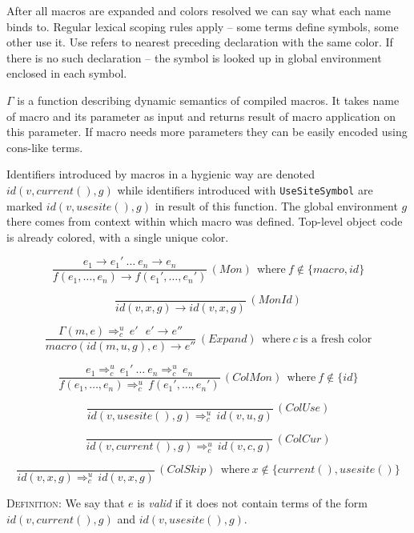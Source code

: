 \documentclass{llncs}
\newcommand{\infrule}[3]{
  \displaystyle
  \frac{#1}{#2}
  \, #3
}
\newcommand{\nf}[2]{#1 \rightarrow #2}
\newcommand{\colr}[2]{#1 \Rightarrow^{u}_{c} \, #2}
\begin{document}
After all macros are expanded and colors resolved we can say what each
name binds to. Regular lexical scoping rules apply -- some terms define
symbols, some other use it. Use refers to nearest preceding declaration
with the same color. If there is no such declaration -- the symbol is
looked up in global environment enclosed in each symbol.

$\Gamma$ is a function describing dynamic semantics of compiled macros.
It takes name of macro and its parameter as input and returns result of
macro application on this parameter. If macro needs more parameters they
can be easily encoded using cons-like terms.

Identifiers introduced by macros in a hygienic way are denoted
$id(v,current(),g)$ while identifiers introduced with \verb,UseSiteSymbol,
are marked $id(v,usesite(),g)$ in result of this function. The
global environment $g$ there comes from context within which macro
was defined. Top-level object code is already colored, with a single
unique color.


$$
  \infrule{
    \nf{e_1}{e_1'} \ \ldots\ \nf{e_n}{e_n}
  }{
    \nf{
      f(e_1, \ldots, e_n)
    }{
      f(e_1', \ldots, e_n')
    }
  }{(Mon) \ \ \textrm{where}\ f \notin \{ macro, id \}}
$$

$$
  \infrule{
  }{
    \nf{
      id (v, x, g)
    }{
      id (v, x, g)
    }
  }{(MonId)}
$$

$$
  \infrule{
    \colr{\Gamma(m,e)}{e'} \ \ \ \nf{e'}{e''}
  }{
    \nf{
      macro (id(m, u, g), e)
    }{
      e''
    }
  }{(Expand) \ \ \textrm{where}\ c \ \textrm{is\ a\ fresh\ color}}
$$

$$
  \infrule{
    \colr{e_1}{e_1'} \ \ldots\ \colr{e_n}{e_n}
  }{
    \colr{
      f(e_1, \ldots, e_n)
    }{
      f(e_1', \ldots, e_n')
    }
  }{(ColMon)\ \ \textrm{where}\ f \notin \{ id \}}
$$

$$
  \infrule{
  }{
    \colr{
      id (v, usesite (), g)
    }{
      id (v, u, g)
    }
  }{(ColUse)}
$$

$$
  \infrule{
  }{
    \colr{
      id (v, current (), g)
    }{
      id (v, c, g)
    }
  }{(ColCur)}
$$

$$
  \infrule{
  }{
    \colr{
      id (v, x, g)
    }{
      id (v, x, g)
    }
  }{(ColSkip)\ \ \textrm{where}\ x \notin \{ current (), usesite () \}}
$$

\textsc{Definition}: We say that $e$ is \emph{valid} if it does not
contain terms of the form $id(v, current(), g)$ and $id(v, usesite(), g)$.
\end{document}
